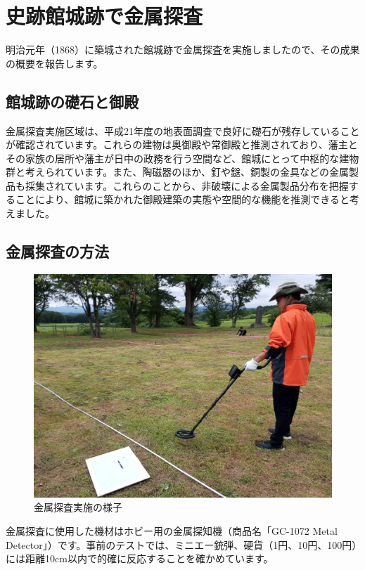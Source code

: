 \documentclass[a4j,11pt,twocolumn,openany]{jsbook}
\begin{document}
\newpage
\section{史跡館城跡で金属探査}

明治元年（1868）に築城された館城跡で金属探査を実施しましたので、その成果の概要を報告します。

\subsection{館城跡の礎石と御殿}
金属探査実施区域は、平成21年度の地表面調査で良好に礎石が残存していることが確認されています。これらの建物は奥御殿や常御殿と推測されており、藩主とその家族の居所や藩主が日中の政務を行う空間など、館城にとって中枢的な建物群と考えられています。また、陶磁器のほか、釘や鎹、銅製の金具などの金属製品も採集されています。これらのことから、非破壊による金属製品分布を把握することにより、館城に築かれた御殿建築の実態や空間的な機能を推測できると考えました。

\subsection{金属探査の方法}

\begin{figure}[ht]
	\centering
	\includegraphics[width=\linewidth]{fig/07_Ishii/02survey_pic.jpg}
	\caption{金属探査実施の様子}
	\label{metal_pic}
\end{figure}

金属探査に使用した機材はホビー用の金属探知機（商品名「GC-1072 Metal Detector」）です。事前のテストでは、ミニエー銃弾、硬貨（1円、10円、100円）には距離10cm以内で的確に反応することを確かめています。
\end{document}
